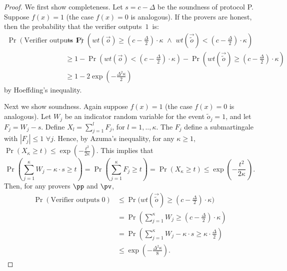 \begin{proof} We first show completeness. 
Let $s = c- \Delta$ be the soundness of protocol P.
Suppose $f(x) = 1$ (the case $f(x) = 0$ is analogous). If the provers are honest, then the probability that the verifier outputs~$1$~is:
\begin{align*}
\Pr(\mbox{Verifier outputs $1$}) &= \Pr \left(wt(\vec{o}) \geq \left(c - \frac{\Delta}{2}\right)\cdot \kappa \,\, \land \,\, wt(\vec{\tilde{o}}) < \left(c - \frac{\Delta}{2}\right)\cdot \kappa \right)\\
&\geq 1-\Pr \left(wt(\vec{o}) < \left(c - \frac{\Delta}{2}\right)\cdot \kappa \right) - \Pr \left(wt(\vec{\tilde{o}}) \geq \left(c - \frac{\Delta}{2}\right)\cdot \kappa \right) \\
&\geq 1 - 2\exp \left(-\frac{\Delta^2\kappa}{2}\right)
\end{align*}
by Hoeffding's inequality.

Next we show soundness.
Again suppose $f(x) = 1$ (the case $f(x) = 0$ is analogous). Let $W_j$ be an indicator random variable for the event $\tilde{o}_j = 1$, and let $F_j = W_j - s$. Define $X_l = \sum_{j=1}^l F_j$, for $l=1,..,\kappa$. The $F_j$ define a submartingale with $|F_j| \leq 1 \,\, \forall j$. Hence, by Azuma's inequality, for any $\kappa\geq 1$, $\Pr(X_\kappa \geq t) \leq \exp(-\frac{t^2}{2\kappa})$. This implies that 
\begin{equation*}
\Pr \left(\sum_{j=1}^{\kappa} W_j - \kappa \cdot s \geq t \right) = \Pr \left(\sum_{j=1}^{\kappa}F_j \geq t \right) = \Pr \left(X_{\kappa} \geq t \right) \leq \exp\left(-\frac{t^2}{2\kappa}\, \right).
\end{equation*}
Then, for any provers $\pp$ and $\pv$,
\begin{align*}
\Pr(\mbox{Verifier outputs $0$}) &\leq \Pr \Big(wt(\vec{\tilde{o}}) \geq (c - \frac{\Delta}{2})\cdot \kappa \Big) \\
&= \Pr \left(\sum_{j=1}^\kappa W_j \geq (c - \frac{\Delta}{2})\cdot \kappa \right) \\
&= \Pr \left(\sum_{j=1}^{\kappa} W_j - \kappa \cdot s \geq \kappa \cdot \frac{\Delta}{2} \right) \\
&\leq \exp \left(-\frac{\Delta^2\kappa}{8}\right). 
\end{align*}
\end{proof}

